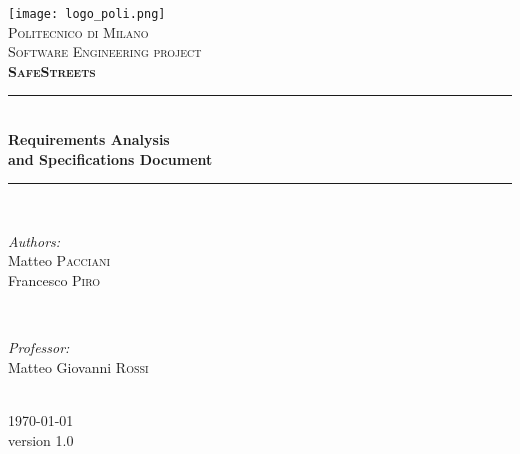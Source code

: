 \begin{titlepage}
	
\newcommand{\HRule}{\rule{\linewidth}{0.5mm}}
\centering

\texttt{[image: logo\_poli.png]}\\[0.5cm]
\textsc{\LARGE Politecnico di Milano}\\[2cm]
\textsc{\Large Software Engineering  project}\\[0.5cm]
\textsc{\LARGE \textbf{SafeStreets}}\\[1.5cm]

\HRule \\[0.4cm]
{ \huge \bfseries Requirements Analysis\\ and Specifications Document}\\[0.4cm] %
\HRule \\[1.5cm]

\begin{minipage}{0.4\textwidth}
	\begin{flushleft} \large
		\emph{Authors:}\\
		Matteo \textsc{Pacciani}\\
		Francesco \textsc{Piro}\\
	\end{flushleft}
\end{minipage}
~
\begin{minipage}{0.4\textwidth}
	\begin{flushright} \large
		\emph{Professor:} \\
		Matteo Giovanni \textsc{Rossi} %
	\end{flushright}
\end{minipage}\\[2cm]

{\large \today}\\[0.5cm] %
{\large version 1.0}\\[2cm]

\vfill
\clearpage

\end{titlepage}